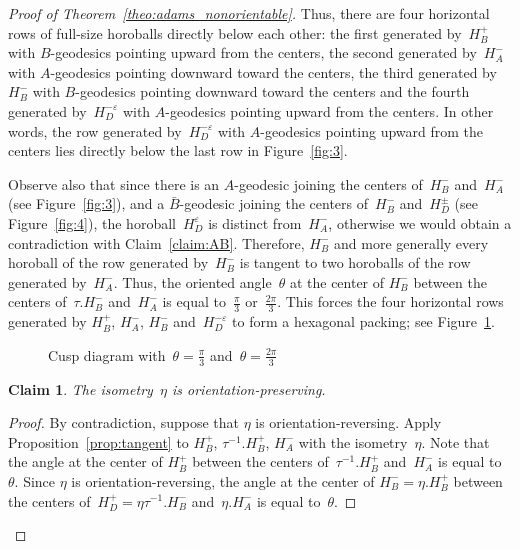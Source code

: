 \documentclass[11pt,reqno]{amsart}
\newtheorem{claim}[theorem]{Claim}
\theoremstyle{definition}
\numberwithin{equation}{section}
\numberwithin{equation}{section}
\begin{document}
\begin{proof}[Proof of Theorem~\ref{theo:adams_nonorientable}]
\medskip

Thus, there are four horizontal rows of full-size horoballs directly below each other: the first generated by~$H_B^+$ with $B$-geodesics pointing upward from the centers, the second generated by~$H_A^-$ with $A$-geodesics pointing downward toward the centers, the third generated by~$H_B^-$ with $B$-geodesics pointing downward toward the centers and the fourth generated by~$H_D^{-\varepsilon}$ with $A$-geodesics pointing upward from the centers.
In other words, the row generated by~$H_D^{-\varepsilon}$ with $A$-geodesics pointing upward from the centers lies directly below the last row in Figure~\ref{fig:3}.

\medskip


Observe also that since there is an $A$-geodesic joining the centers of~$H_B^-$ and~$H_A^-$ (see Figure~\ref{fig:3}), and a $\bar{B}$-geodesic joining the centers of~$H_B^-$ and~$H_D^\pm$ (see Figure~\ref{fig:4}), the horoball~$H_D^\varepsilon$ is distinct from~$H_A^-$, otherwise we would obtain a contradiction with Claim~\ref{claim:AB}.
Therefore, $H_B^-$ and more generally every horoball of the row generated by~$H_B^-$ is tangent to two horoballs of the row generated by~$H_A^-$.
Thus, the oriented angle~$\theta$ at the center of $H_B^-$ between the centers of~$\tau.H_B^-$ and~$H_A^-$ is equal to~$\frac{\pi}{3}$ or~$\frac{2\pi}{3}$.
This forces the four horizontal rows generated by $H_B^+$, $H_A^-$, $H_B^-$ and~$H_D^{-\varepsilon}$ to form a hexagonal packing; see Figure~\ref{fig:5}.

\medskip

\begin{figure}[htbp!]
\centering
\vspace*{0.7cm}
\def\svgwidth{0.6\textheight}

\vspace*{0.4cm}
\caption{Cusp diagram with~$\theta=\frac{\pi}{3}$ and~$\theta=\frac{2\pi}{3}$} \label{fig:5}
\end{figure}

\begin{claim}
The isometry~$\eta$ is orientation-preserving.
\end{claim}

\begin{proof}
By contradiction, suppose that $\eta$ is orientation-reversing.
Apply Proposition~\ref{prop:tangent} to $H_B^+$, $\tau^{-1}.H_B^+$, $H_A^-$ with the isometry~$\eta$.
Note that the angle at the center of $H_B^+$ between the centers of~$\tau^{-1}.H_B^+$ and~$H_A^-$ is equal to~$\theta$.
Since $\eta$ is orientation-reversing, the angle at the center of $H_B^-=\eta.H_B^+$ between the centers of~$H_D^+=\eta \tau^{-1}.H_B^-$ and~$\eta.H_A^-$ is equal to~$\theta$.


\end{proof}
\end{proof}
\end{document}
